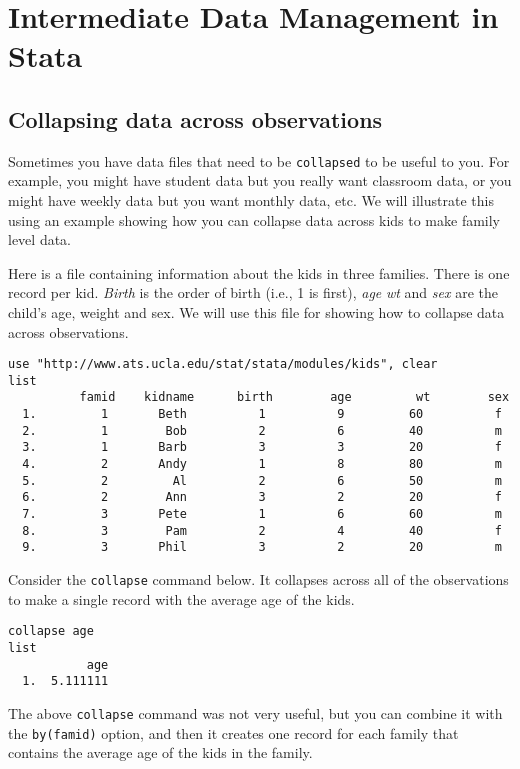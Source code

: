 \section{Intermediate Data Management in Stata}
\subsection{Collapsing data across observations}

Sometimes you have data files that need to be \lstinline{collapsed} to be useful to you. For example, you might have student data but you really want classroom data, or you might have weekly data but you want monthly data, etc. We will illustrate this using an example showing how you can collapse data across kids to make family level data.

Here is a file containing information about the kids in three families. There is one record per kid. \textit{Birth} is the order of birth (i.e., 1 is first), \textit{age} \textit{wt} and \textit{sex} are the child's age, weight and sex. We will use this file for showing how to collapse data across observations.

\begin{lstlisting}
use "http://www.ats.ucla.edu/stat/stata/modules/kids", clear
list
          famid    kidname      birth        age         wt        sex
  1.         1       Beth          1          9         60          f
  2.         1        Bob          2          6         40          m
  3.         1       Barb          3          3         20          f
  4.         2       Andy          1          8         80          m
  5.         2         Al          2          6         50          m
  6.         2        Ann          3          2         20          f
  7.         3       Pete          1          6         60          m
  8.         3        Pam          2          4         40          f
  9.         3       Phil          3          2         20          m
\end{lstlisting}

Consider the \lstinline{collapse} command below. It collapses across all of the observations to make a single record with the average age of the kids.

\begin{lstlisting}
collapse age
list
           age
  1.  5.111111
\end{lstlisting}

The above \lstinline{collapse} command was not very useful, but you can combine it with the \lstinline{by(famid)} option, and then it creates one record for each family that contains the average age of the kids in the family.

